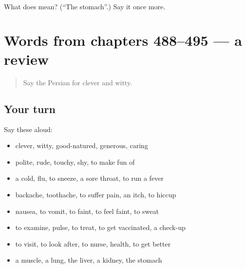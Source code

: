\begin{tcolorbox}[breakable,colback=teal!4,colframe=teal!35!black,title={Before you move on}]
What does  mean? (\textquotedblleft{}The stomach\textquotedblright{}.) Say it once more.
\end{tcolorbox}
\section[(dialogue)]{Words from chapters 488–495 — a review}

\label{lesson:FA-R495-review-488-495}



\begin{quote}
Say the Persian for clever and witty.
\end{quote}

\subsection*{Your turn}
Say these aloud:

\begin{itemize}
\raggedright
  \item clever, witty, good-natured, generous, caring
  \item polite, rude, touchy, shy, to make fun of
  \item a cold, flu, to sneeze, a sore throat, to run a fever
  \item backache, toothache, to suffer pain, an itch, to hiccup
  \item nausea, to vomit, to faint, to feel faint, to sweat
  \item to examine, pulse, to treat, to get vaccinated, a check-up
  \item to visit, to look after, to nurse, health, to get better
  \item a muscle, a lung, the liver, a kidney, the stomach
\end{itemize}


